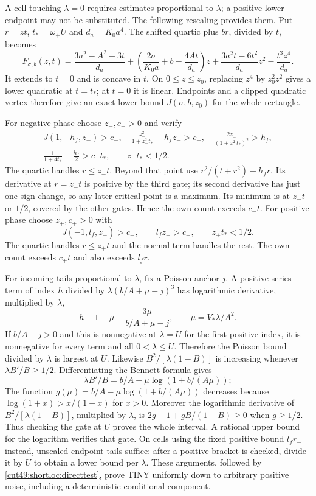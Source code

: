 \documentclass[11pt,a4paper]{article}
\numberwithin{equation}{section}
\theoremstyle{definition}
\theoremstyle{remark}
\begin{document}
A cell touching $\lambda=0$ requires estimates proportional to $\lambda$;
a positive lower endpoint may not be substituted. The following rescaling
provides them. Put $r=zt$, $t_*=\omega_+U$ and $d_a=K_0a^4$.
The shifted quartic plus $br$, divided by $t$, becomes
\begin{equation}\label{cut49:shortloc:scaledown}
 F_{\sigma,b}(z,t)=\frac{3a^2-A^2-3t}{d_a}
 +\left(\frac{2\sigma}{K_0a}+b-\frac{4At}{d_a}\right)z
 +\frac{3a^2t-6t^2}{d_a}z^2-\frac{t^3z^4}{d_a}.
\end{equation}
It extends to $t=0$ and is concave in $t$. On $0\le z\le z_0$, replacing
$z^4$ by $z_0^2z^2$ gives a lower quadratic at $t=t_*$; at $t=0$ it is
linear. Endpoints and a clipped quadratic vertex therefore give an exact
lower bound $J(\sigma,b,z_0)$ for the whole rectangle.

For negative phase choose $z_-,c_->0$ and verify
\begin{gather}\label{cut49:shortloc:tinynegative}
 J(1,-h_f,z_-)>c_-,\quad
 \frac{z_-^2}{1+z_-^2t_*}-h_fz_->c_-,\quad
 \frac{2z_-}{(1+z_-^2t_*)^2}>h_f,\\
 \frac1{1+4t_*}-\frac{h_f}{2}>c_-t_*,\qquad z_-t_*<1/2.\nonumber
\end{gather}
The quartic handles $r\le z_-t$. Beyond that point use
$r^2/(t+r^2)-h_fr$. Its derivative at $r=z_-t$ is positive by the third
gate; its second derivative has just one sign change, so any later critical
point is a maximum. Its minimum is at $z_-t$ or $1/2$, covered by the other
gates. Hence the own count exceeds $c_-t$.
For positive phase choose $z_+,c_+>0$ with
\begin{equation}\label{cut49:shortloc:tinypositive}
 J(-1,l_f,z_+)>c_+,\qquad l_fz_+>c_+,\qquad z_+t_*<1/2.
\end{equation}
The quartic handles $r\le z_+t$ and the normal term handles the rest.
The own count exceeds $c_+t$ and also exceeds $l_fr$.

For incoming tails proportional to $\lambda$, fix a Poisson anchor $j$.
A positive series term of index $h$ divided by
$\lambda(b/A+\mu-j)^3$ has logarithmic derivative, multiplied by $\lambda$,
\[
 h-1-\mu-\frac{3\mu}{b/A+\mu-j},\qquad \mu=V_*\lambda/A^2.
\]
If $b/A-j>0$ and this is nonnegative at $\lambda=U$ for the first positive
index, it is nonnegative for every term and all $0<\lambda\le U$.
Therefore the Poisson bound divided by $\lambda$ is largest at $U$.
Likewise $B^2/[\lambda(1-B)]$ is increasing whenever
$\lambda B'/B\ge1/2$. Differentiating the Bennett formula gives
\[
 \lambda B'/B=b/A-\mu\log(1+b/(A\mu));
\]
The function $g(\mu)=b/A-\mu\log(1+b/(A\mu))$ decreases because
$\log(1+x)>x/(1+x)$ for $x>0$. Moreover the logarithmic derivative of
$B^2/[\lambda(1-B)]$, multiplied by $\lambda$, is
$2g-1+gB/(1-B)\ge0$ when $g\ge1/2$. Thus checking the gate at $U$
proves the whole interval. A rational upper bound for the logarithm
verifies that gate. On cells using the fixed positive bound $l_fr_-$ instead,
unscaled endpoint tails suffice: after a positive bracket is checked, divide
it by $U$ to obtain a lower bound per $\lambda$. These arguments, followed by
\eqref{cut49:shortloc:directtest}, prove TINY uniformly down to arbitrary positive
noise, including a deterministic conditional component.
\end{document}
